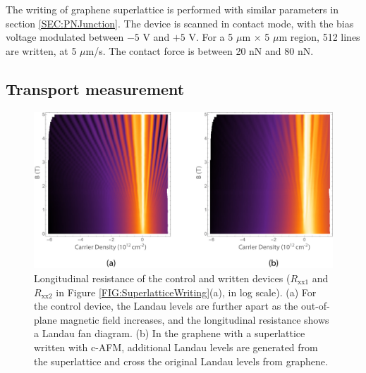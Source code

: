 \documentclass[pdflatex, sectionletters, 12pt]{pittetd}    %
\begin{document}
The writing of graphene superlattice is performed with similar parameters in section \ref{SEC:PNJunction}. The device is scanned in contact mode, with the bias voltage modulated between $-5$ V and $+5$ V. For a 5 $\mu$m $\times$ 5 $\mu$m region, 512 lines are written, at 5 $\mu$m/s. The contact force is between 20 nN and 80 nN.

\subsection{Transport measurement}

\begin{figure}[h!]
	\centering
	\includegraphics[width=1.0\textwidth]{Drawing/SuperlatticeControl.pdf}
	\caption{Longitudinal resistance of the control and written devices ($R_\mathrm{xx1}$ and $R_\mathrm{xx2}$ in Figure \ref{FIG:SuperlatticeWriting}(a), in log scale). (a) For the control device, the Landau levels are further apart as the out-of-plane magnetic field increases, and the longitudinal resistance shows a Landau fan diagram. (b) In the graphene with a superlattice written with c-AFM, additional Landau levels are generated from the superlattice and cross the original Landau levels from graphene.}
	\label{FIG:SuperlatticeControl}
\end{figure}
\end{document}
